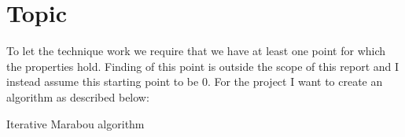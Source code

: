 \documentclass[../main.tex]{subfiles}
\begin{document}
\section{Topic}
To let the technique work we require that we have at least one point for which the properties hold. Finding of this point is outside the scope of this report and I instead assume this starting point to be 0. For the project I want to create an algorithm as described below: 
 
\begin{algorithm}[H]
\caption{Iterative Marabou algorithm}\label{alg:cap}

\end{algorithm}
\end{document}

